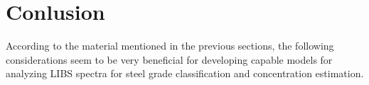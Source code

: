 \documentclass[12pt,a4paper]{article}
\begin{document}
	\section{Conlusion}
	According to the material mentioned in the previous sections, the following considerations seem to be very beneficial for developing capable models for analyzing LIBS spectra for steel grade classification and concentration estimation.
\end{document}
